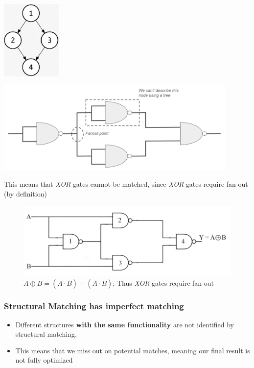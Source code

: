 \documentclass{article}
\begin{document}
\begin{minipage}[t]{0.5\textwidth}
    \centering
    \includegraphics[width=3cm, scale=1]{S4/notATree.PNG}
    \captionsetup{justification=centering}
\end{minipage}%
\begin{minipage}[t]{0.5\textwidth}
    \centering
    \includegraphics[width=12cm, scale=1]{S4/cantBeDescribed.PNG}
    \captionsetup{justification=centering}
\end{minipage}%

\vspace{2.5cm}
This means that \textit{XOR} gates cannot be matched, since \textit{XOR} gates require fan-out (by definition)

\begin{figure}[htp]
    \centering
    \includegraphics[width=12cm, scale=1]{S4/xorGate.PNG}
    \caption{$A\oplus B = (A \cdot \bar{B}) + (\bar{A} \cdot B)$; Thus \textit{XOR} gates require fan-out}
\end{figure}

\subsubsection{Structural Matching has imperfect matching}
\begin{itemize}
    \item Different structures \textbf{with the same functionality} are not identified by structural matching.
    \item This means that we miss out on potential matches, meaning our final result is not fully optimized
\end{itemize}
\end{document}
